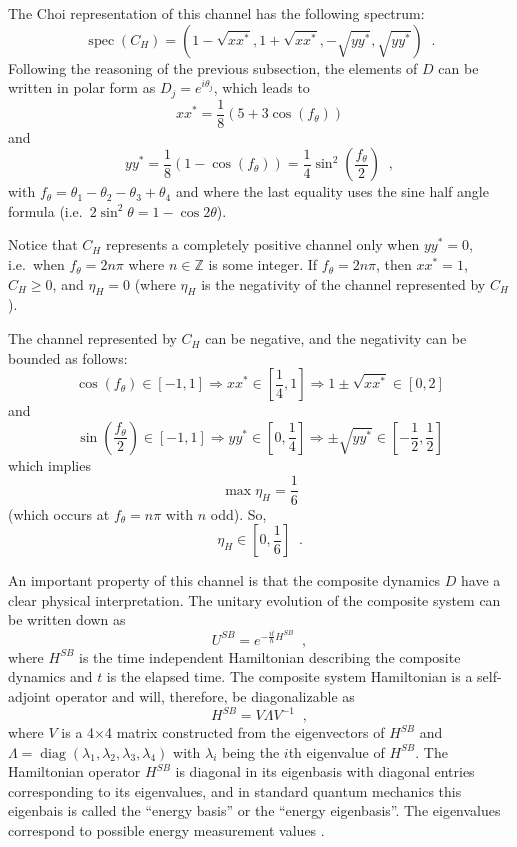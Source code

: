 The Choi representation of this channel has the following spectrum:
$$
\operatorname{spec}(C_H) = \left( 1 - \sqrt{x x^*},1 + \sqrt{x x^*}, -\sqrt{y y^*},\sqrt{y y^*}\right)\;\;.
$$
Following the reasoning of the previous subsection, the elements of $D$ can be written in polar form as $D_j = e^{i \theta_j}$, which leads to
$$
xx^* = \frac{1}{8} \left(5 + 3\cos{\left(f_\theta\right)}\right)
$$
and
$$
yy^* = \frac{1}{8}\left( 1 - \cos{\left(f_\theta\right)} \right) = \frac{1}{4} \sin^2{\left(\frac{f_\theta}{2}\right)}\;\;,
$$
with $f_\theta = \theta_1 - \theta_2 - \theta_3 + \theta_4 $ and where the last equality uses the sine half angle formula (i.e.\ $2 \sin^2\theta = 1 - \cos 2\theta$).

Notice that $C_H$ represents a completely positive channel only when $yy^*=0$, i.e.\ when $f_\theta = 2n\pi$ where $n\in\mathbb{Z}$ is some integer.  If $f_\theta = 2n\pi$, then $xx^*=1$, $C_H \ge 0$, and $\eta_H=0$ (where $\eta_H$ is the negativity of the channel represented by $C_H$).  

The channel represented by $C_H$ can be negative, and the negativity can be bounded as follows: 
$$
\cos(f_\theta)\in[-1,1]\Rightarrow xx^*\in\left[\frac{1}{4},1\right]\Rightarrow 1\pm \sqrt{xx^*}\in[0,2]
$$
and
$$
\sin\left(\frac{f_\theta}{2}\right)\in[-1,1]\Rightarrow yy^*\in\left[0,\frac{1}{4}\right]\Rightarrow\pm\sqrt{yy^*}\in\left[-\frac{1}{2},\frac{1}{2}\right]
$$
which implies
$$
\max \eta_H = \frac{1}{6}
$$
(which occurs at $f_\theta = n\pi$ with $n$ odd).  So,
$$
\eta_H \in \left[0,\frac{1}{6}\right]\;\;.
$$

An important property of this channel is that the composite dynamics $D$ have a clear physical interpretation.  The unitary evolution of the composite system can be written down as
$$
U^{SB} = e^{-\frac{it}{\hbar} H^{SB}}\;\;,
$$
where $H^{SB}$ is the time independent Hamiltonian describing the composite dynamics and $t$ is the elapsed time.  The composite system Hamiltonian is a self-adjoint operator and will, therefore, be diagonalizable as
$$
H^{SB} = V\Lambda V^{-1}\;\;,
$$    
where $V$ is a 4$\times$4 matrix constructed from the eigenvectors of $H^{SB}$ and $\Lambda=\operatorname{diag}(\lambda_1,\lambda_2,\lambda_3,\lambda_4)$ with $\lambda_i$ being the $i$th eigenvalue of $H^{SB}$.  The Hamiltonian operator $H^{SB}$ is diagonal in its eigenbasis with diagonal entries corresponding to its eigenvalues, and in standard quantum mechanics this eigenbais is called the ``energy basis'' or the ``energy eigenbasis''.  The eigenvalues correspond to possible energy measurement values \cite{Landau1977}.  

